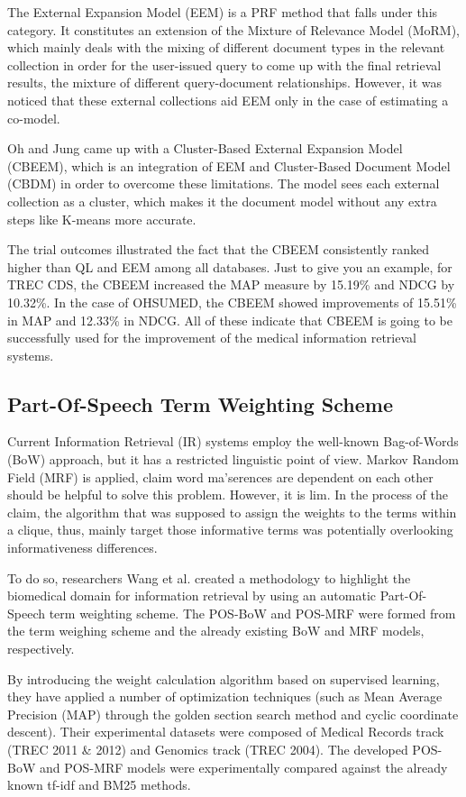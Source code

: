 \documentclass[conference]{IEEEtran}
\begin{document}
The External Expansion Model (EEM) is a PRF method that falls under this category. It constitutes an extension of the Mixture of Relevance Model (MoRM), which mainly deals with the mixing of different document types in the relevant collection in order for the user-issued query to come up with the final retrieval results, the mixture of different query-document relationships. However, it was noticed that these external collections aid EEM only in the case of estimating a co-model.

Oh and Jung \cite{Oh2015} came up with a Cluster-Based External Expansion Model (CBEEM), which is an integration of EEM and Cluster-Based Document Model (CBDM) in order to overcome these limitations. The model sees each external collection as a cluster, which makes it the document model without any extra steps like K-means more accurate.

The trial outcomes illustrated the fact that the CBEEM consistently ranked higher than QL and EEM among all databases. Just to give you an example, for TREC CDS, the CBEEM increased the MAP measure by 15.19\% and NDCG by 10.32\%. In the case of OHSUMED, the CBEEM showed improvements of 15.51\% in MAP and 12.33\% in NDCG. All of these indicate that CBEEM is going to be successfully used for the improvement of the medical information retrieval systems.

\subsection{Part-Of-Speech Term Weighting Scheme}

Current Information Retrieval (IR) systems employ the well-known Bag-of-Words (BoW) approach, but it has a restricted linguistic point of view. Markov Random Field (MRF) is applied, claim word ma'serences are dependent on each other should be helpful to solve this problem. However, it is lim. In the process of the claim, the algorithm that was supposed to assign the weights to the terms within a clique, thus, mainly target those informative terms was potentially overlooking informativeness differences.

To do so, researchers Wang et al. \cite{Wang2016} created a methodology to highlight the biomedical domain for information retrieval by using an automatic Part-Of-Speech term weighting scheme. The POS-BoW and POS-MRF were formed from the term weighing scheme and the already existing BoW and MRF models, respectively.

By introducing the weight calculation algorithm based on supervised learning, they have applied a number of optimization techniques (such as Mean Average Precision (MAP) through the golden section search method and cyclic coordinate descent). Their experimental datasets were composed of Medical Records track (TREC 2011 \& 2012) and Genomics track (TREC 2004). The developed POS-BoW and POS-MRF models were experimentally compared against the already known tf-idf and BM25 methods.
\end{document}
